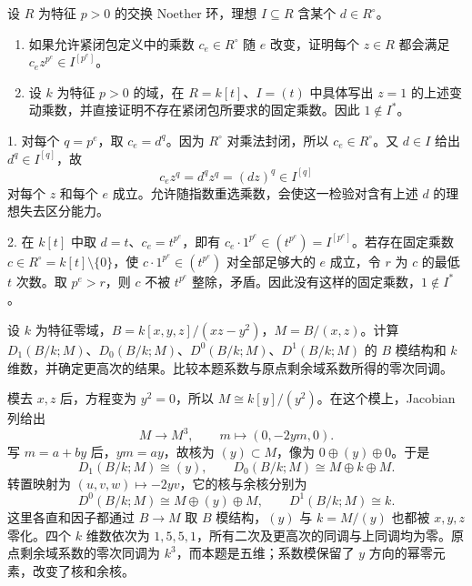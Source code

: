 \begin{exercise}\label{b3:ex:C-tight-fixed-multiplier}
	设 \(R\) 为特征 \(p>0\) 的交换 Noether 环，理想 \(I\subseteq R\) 含某个 \(d\in R^\circ\)。
	\begin{enumerate}
		\item 如果允许紧闭包定义中的乘数 \(c_e\in R^\circ\) 随 \(e\) 改变，证明每个 \(z\in R\) 都会满足 \(c_ez^{p^e}\in I^{[p^e]}\)。
		\item 设 \(k\) 为特征 \(p>0\) 的域，在 \(R=k[t]\)、\(I=(t)\) 中具体写出 \(z=1\) 的上述变动乘数，并直接证明不存在紧闭包所要求的固定乘数。因此 \(1\notin I^*\)。
	\end{enumerate}
\end{exercise}
\begin{solution}
	1. 对每个 \(q=p^e\)，取 \(c_e=d^q\)。因为 \(R^\circ\) 对乘法封闭，所以 \(c_e\in R^\circ\)。又 \(d\in I\) 给出 \(d^q\in I^{[q]}\)，故
	\[
		c_ez^q=d^qz^q=(dz)^q\in I^{[q]}
	\]
	对每个 \(z\) 和每个 \(e\) 成立。允许随指数重选乘数，会使这一检验对含有上述 \(d\) 的理想失去区分能力。

	2. 在 \(k[t]\) 中取 \(d=t\)、\(c_e=t^{p^e}\)，即有 \(c_e\cdot1^{p^e}\in(t^{p^e})=I^{[p^e]}\)。若存在固定乘数 \(c\in R^\circ=k[t]\setminus\{0\}\)，使 \(c\cdot1^{p^e}\in(t^{p^e})\) 对全部足够大的 \(e\) 成立，令 \(r\) 为 \(c\) 的最低 \(t\) 次数。取 \(p^e>r\)，则 \(c\) 不被 \(t^{p^e}\) 整除，矛盾。因此没有这样的固定乘数，\(1\notin I^*\)。
\end{solution}


\begin{exercise}\label{b3:ex:C-aq-thick-coefficients}
	设 \(k\) 为特征零域，\(B=k[x,y,z]/(xz-y^2)\)，\(M=B/(x,z)\)。计算 \(D_1(B/k;M)\)、\(D_0(B/k;M)\)、\(D^0(B/k;M)\)、\(D^1(B/k;M)\) 的 \(B\) 模结构和 \(k\) 维数，并确定更高次的结果。比较本题系数与原点剩余域系数所得的零次同调。
\end{exercise}
\begin{solution}
	模去 \(x,z\) 后，方程变为 \(y^2=0\)，所以 \(M\cong k[y]/(y^2)\)。在这个模上，Jacobian 列给出
	\[
		M\longrightarrow M^3,\qquad m\longmapsto(0,-2ym,0).
	\]
	写 \(m=a+by\) 后，\(ym=ay\)，故核为 \((y)\subset M\)，像为 \(0\oplus(y)\oplus0\)。于是
	\[
		D_1(B/k;M)\cong(y),\qquad D_0(B/k;M)\cong M\oplus k\oplus M.
	\]
	转置映射为 \((u,v,w)\mapsto-2yv\)，它的核与余核分别为
	\[
		D^0(B/k;M)\cong M\oplus(y)\oplus M,\qquad D^1(B/k;M)\cong k.
	\]
	这里各直和因子都通过 \(B\to M\) 取 \(B\) 模结构，\((y)\) 与 \(k=M/(y)\) 也都被 \(x,y,z\) 零化。四个 \(k\) 维数依次为 \(1,5,5,1\)，所有二次及更高次的同调与上同调均为零。原点剩余域系数的零次同调为 \(k^3\)，而本题是五维；系数模保留了 \(y\) 方向的幂零元素，改变了核和余核。
\end{solution}

